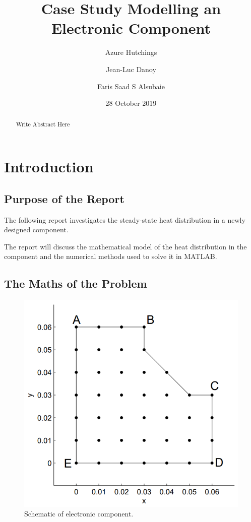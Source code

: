 \documentclass[12pt,a4paper]{article}
\title{Case Study Modelling an Electronic Component}
\author{
  Azure Hutchings
  \and
  Jean-Luc Danoy
  \and
  Faris Saad S Alsubaie
}
\date{28 October 2019}
\begin{document}
 
\begin{titlepage}
\maketitle
\end{titlepage}

\renewcommand{\abstractname}{Executive Summary}
\begin{abstract}
Write Abstract Here
\end{abstract}

\pagebreak

\tableofcontents

\pagebreak

\section{Introduction}

\subsection{Purpose of the Report}
The following report investigates the steady-state heat distribution in a newly designed component. 

The report will discuss the mathematical model of the heat distribution in the component and the numerical methods used to solve it in MATLAB. 

\subsection{The Maths of the Problem}

\begin{figure}[h!]
	\includegraphics[width=\linewidth]{images/Component.png}
	\caption{Schematic of electronic component.}
	\label{fig:componentSchematic}
\end{figure}
\end{document}
